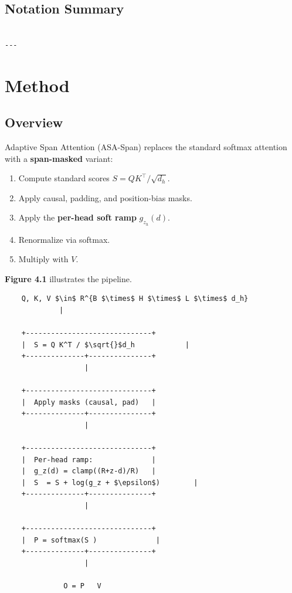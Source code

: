 \subsection{Notation Summary}

\begin{lstlisting}

---
\end{lstlisting}


\section{Method}

\subsection{Overview}

Adaptive Span Attention (ASA-Span) replaces the standard softmax attention 
with a \textbf{span-masked} variant:

\begin{enumerate}
\item Compute standard scores $S = QK^\top / \sqrt{d_h}$.
\item Apply causal, padding, and position-bias masks.
\item Apply the \textbf{per-head soft ramp} $g_{z_h}(d)$.
\item Renormalize via softmax.
\item Multiply with $V$.

\end{enumerate}
\textbf{Figure 4.1} illustrates the pipeline.

\begin{lstlisting}
    Q, K, V $\in$ R^{B $\times$ H $\times$ L $\times$ d_h}
             |
              
    +------------------------------+
    |  S = Q K^T / $\sqrt{}$d_h            |
    +--------------+---------------+
                   |
                    
    +------------------------------+
    |  Apply masks (causal, pad)   |
    +--------------+---------------+
                   |
                    
    +------------------------------+
    |  Per-head ramp:              |
    |  g_z(d) = clamp((R+z-d)/R)   |
    |  S  = S + log(g_z + $\epsilon$)        |
    +--------------+---------------+
                   |
                    
    +------------------------------+
    |  P = softmax(S )              |
    +--------------+---------------+
                   |
                    
              O = P   V
\end{lstlisting}

